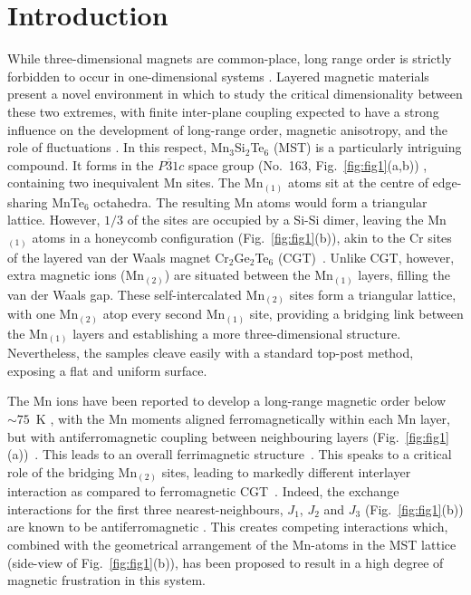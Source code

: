 \documentclass[preprint,amsmath,amssymb,aps,nofootinbib,superscriptaddress]{revtex4-2}
\begin{document}
\section{Introduction}
While three-dimensional magnets are common-place, long range order is strictly forbidden to occur in one-dimensional systems \cite{PRL1966Mermin}. Layered magnetic materials present a novel environment in which to study the critical dimensionality between these two extremes, with finite inter-plane coupling expected to have a strong influence on the development of long-range order, magnetic anisotropy, and the role of fluctuations \cite{Nature2018Burch}. In this respect, Mn$_3$Si$_2$Te$_6$ (MST) is a particularly intriguing compound. It forms in the $P\overline{3}1c$ space group (No.~163, Fig.~\ref{fig:fig1}(a,b)) \cite{JMMM1981Rimet,JSSC1986Vincent}, containing two inequivalent Mn sites. The Mn$_{(1)}$ atoms sit at the centre of edge-sharing MnTe$_6$ octahedra. The resulting Mn atoms would form a triangular lattice. However, $1/3$ of the sites are occupied by a Si-Si dimer, leaving the Mn$_{(1)}$ atoms in a honeycomb configuration (Fig.~\ref{fig:fig1}(b)), akin to the Cr sites of the layered van der Waals magnet Cr$_2$Ge$_2$Te$_6$ (CGT)~\cite{PRL2019Zhang,PRB2019Suzuki,PRB2020Watson}. Unlike CGT, however, extra magnetic ions (Mn$_{(2)}$) are situated between the Mn$_{(1)}$ layers, filling the van der Waals gap. These self-intercalated Mn$_{(2)}$ sites form a triangular lattice, with one Mn$_{(2)}$ atop every second Mn$_{(1)}$ site, providing a bridging link between the Mn$_{(1)}$ layers and establishing a more three-dimensional structure. Nevertheless, the samples cleave easily with a standard top-post method, exposing a flat and uniform surface.

The Mn ions have been reported to develop a long-range magnetic order below $\sim75$~K \cite{PRB2018Liu}, with the Mn moments aligned ferromagnetically within each Mn layer, but with antiferromagnetic coupling between neighbouring layers (Fig.~\ref{fig:fig1}(a))~\cite{PRB2017May}. This leads to an overall ferrimagnetic structure~\cite{PRB2018Liu,JAP2021Olmos}. This speaks to a critical role of the bridging Mn$_{(2)}$ sites, leading to markedly different interlayer interaction as compared to ferromagnetic CGT~\cite{PRB2017May,JMMM2020May}. Indeed, the exchange interactions for the first three nearest-neighbours, $J_1$, $J_2$ and $J_3$ (Fig.~\ref{fig:fig1}(b)) are known to be antiferromagnetic \cite{PRB2017May}. This creates competing interactions which, combined with the geometrical arrangement of the Mn-atoms in the MST lattice (side-view of Fig.~\ref{fig:fig1}(b)), has been proposed to result in a high degree of magnetic frustration in this system. 
\end{document}
